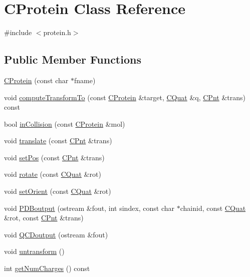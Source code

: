 \hypertarget{classCProtein}{\section{C\-Protein Class Reference}
\label{classCProtein}
}


{\ttfamily \#include $<$protein.\-h$>$}

\subsection*{Public Member Functions}
\begin{DoxyCompactItemize}
\item 
\hyperlink{classCProtein_add7b99ce966900c95f6a0b5ce1d644ac}{C\-Protein} (const char $\ast$fname)
\item 
void \hyperlink{classCProtein_adba2a9646ab9e4d026192e124965a0b3}{compute\-Transform\-To} (const \hyperlink{classCProtein}{C\-Protein} \&target, \hyperlink{classCQuat}{C\-Quat} \&q, \hyperlink{classCPnt}{C\-Pnt} \&trans) const 
\item 
bool \hyperlink{classCProtein_afb3fe3188e1a61488295b4fcdb3664e6}{in\-Collision} (const \hyperlink{classCProtein}{C\-Protein} \&mol)
\item 
void \hyperlink{classCProtein_a7d82de84256c6e9b5868b8fe08df6e15}{translate} (const \hyperlink{classCPnt}{C\-Pnt} \&trans)
\item 
void \hyperlink{classCProtein_a890bc62459bae1a93b67e90cdcef18eb}{set\-Pos} (const \hyperlink{classCPnt}{C\-Pnt} \&trans)
\item 
void \hyperlink{classCProtein_a2ab8b5e61cd26aafde2841b6b3655d45}{rotate} (const \hyperlink{classCQuat}{C\-Quat} \&rot)
\item 
void \hyperlink{classCProtein_a40f7c9e8d7b4717e00027b0c92ad109b}{set\-Orient} (const \hyperlink{classCQuat}{C\-Quat} \&rot)
\item 
void \hyperlink{classCProtein_af6187aab0e8c8d59f60ddfed41ee7bd2}{P\-D\-Boutput} (ostream \&fout, int sindex, const char $\ast$chainid, const \hyperlink{classCQuat}{C\-Quat} \&rot, const \hyperlink{classCPnt}{C\-Pnt} \&trans)
\item 
void \hyperlink{classCProtein_a14c964f72704f17611aa0b941ad50ff0}{Q\-C\-Doutput} (ostream \&fout)
\item 
void \hyperlink{classCProtein_ac7497ee640c9910a3b05ed890845b118}{untransform} ()
\item 
int \hyperlink{classCProtein_a8d680f9e8b07520eedfe5b43f50d1c03}{get\-Num\-Charges} () const 

\end{DoxyCompactItemize}
